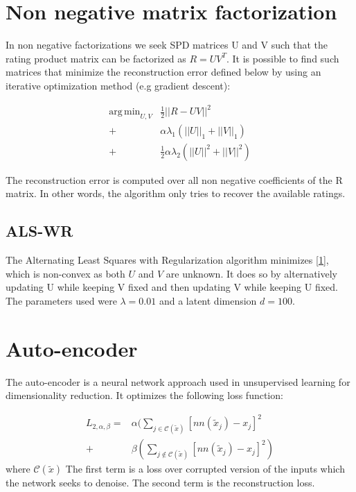 \documentclass[10pt,twocolumn]{article}
\DeclareMathOperator*{\argmin}{arg\,min}
\begin{document}
\section{Non negative matrix factorization}

In non negative factorizations we seek SPD matrices U and V such that the rating product matrix can be factorized as $R = UV^T$. It is possible to find such matrices that minimize the reconstruction error defined below by using an iterative optimization method (e.g gradient descent): 

\begin{equation}
\begin{split}
\argmin_{U,V} & \frac{1}{2} ||R - UV||^2 \\
			  + & \alpha \lambda_1 (||U||_1 + ||V||_1) \\
			  + & \frac{1}{2} \alpha \lambda_2  (||U||^2 + ||V||^2) 
\end{split}
\end{equation}  

The reconstruction error is computed over all non negative coefficients of the R matrix. In other words, the algorithm only tries to recover the available ratings. 

\subsection{ALS-WR}

The Alternating Least Squares with Regularization algorithm \cite{zhou2008large}  minimizes \eqref{1}, which is non-convex as both $U$ and $V$ are unknown. It does so by alternatively updating U while keeping V fixed and then updating V while keeping U fixed. The parameters used were $\lambda = 0.01$ and a latent dimension $d = 100$.


\section{Auto-encoder}

The auto-encoder is a neural network approach used in unsupervised learning for dimensionality reduction. It optimizes the following loss function:

\begin{equation}
\begin{split}
L_{2, \alpha, \beta} = &\alpha ( \sum_{j \in \mathcal{C}(\tilde{x})} [ nn(\tilde{x}_j) - x_j ]^2 \\
+ & \beta ( \sum_{j \notin \mathcal{C}(\tilde{x})} [nn(\tilde{x}_j) - x_j ]^2)
\end{split}
\end{equation}
where $\mathcal{C}(\tilde{x})$ The first term is a loss over corrupted version of the inputs which the network seeks to denoise. The second term is the reconstruction loss.
\end{document}
